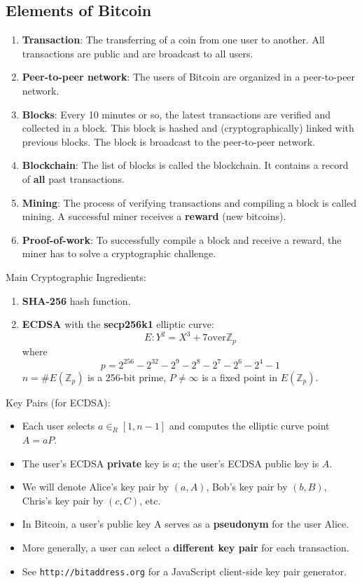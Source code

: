 \documentclass[12pt,titlepage]{article}
\begin{document}
\subsection{Elements of Bitcoin}
\begin{enumerate}
	\item \textbf{Transaction}: The transferring of a coin from one user to another. All transactions are public and are broadcast to all users.
	\item \textbf{Peer-to-peer network}: The users of Bitcoin are organized in a peer-to-peer network.
	\item \textbf{Blocks}: Every 10 minutes or so, the latest transactions are verified and collected in a block. This block is hashed and (cryptographically) linked with previous blocks. The block is broadcast to the peer-to-peer network.
	\item \textbf{Blockchain}: The list of blocks is called the blockchain. It contains a record of \textbf{all} past transactions.
	\item \textbf{Mining}: The process of verifying transactions and compiling a block is called mining. A successful miner receives a \textbf{reward} (new bitcoins).
	\item \textbf{Proof-of-work}: To successfully compile a block and receive a reward, the miner has to solve a cryptographic challenge.
\end{enumerate}
Main Cryptographic Ingredients: \begin{enumerate}
	\item \textbf{SHA-256} hash function.
	\item \textbf{ECDSA} with the \textbf{secp256k1} elliptic curve:$$E : Y^2 = X^3 + 7 \text{over} \mathbb{Z}_p$$ where $$p = 2^{256} - 2^{32} - 2^9 - 2^8 - 2^7 - 2^6 - 2^4 - 1$$
	$n = \#E(\mathbb{Z}_p)$ is a 256-bit prime, $P \neq \infty$ is a fixed point in $E(\mathbb{Z}_p)$.
\end{enumerate}
Key Pairs (for ECDSA): \begin{itemize}
	\item Each user selects $a \in_R [1, n - 1]$ and computes the elliptic curve point $A = aP$.
	\item The user’s ECDSA \textbf{private} key is $a$; the user’s ECDSA public key is $A$.
	\item We will denote Alice’s key pair by $(a, A)$, Bob’s key pair by $(b, B)$, Chris’s key pair by $(c, C)$, etc.
	\item In Bitcoin, a user’s public key A serves as a \textbf{pseudonym} for the user Alice.
	\item More generally, a user can select a \textbf{different key pair} for each transaction.
	\item See \texttt{http://bitaddress.org} for a JavaScript client-side key pair generator.
\end{itemize}
\end{document}
